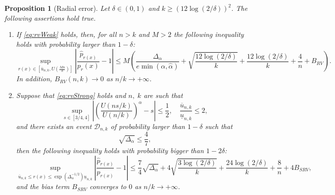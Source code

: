 \documentclass{article}
\numberwithin{equation}{section}
\newtheorem{proposition}{Proposition}[section]
\begin{document}
\begin{proposition}[Radial error]\label{thm:radial-error-part} Let
\(\delta\in(0,1)\) and
\(k\geq (12\log(2/\delta))^2\). The following assertions hold true.
\begin{enumerate}[label=(\roman*)]
    \item If \eqref{eq:rvWeak} holds, then, for all \(n>k\) and \(M>2\)
        the following inequality holds with probability larger
        than \(1-\delta\):
        \begin{equation*}
            \sup_{r(x)\in \left[\overline{u}_{n,k},
            U(\frac{Mn}{k})\right]}
            \left|\frac{\widehat{p}_{r(x)}}{p_r(x)}-1\right|  \leq M
            \left(\frac{\Delta_{\alpha}}{e \min{(\alpha,
                \hat{\alpha})}} +
                \sqrt{\frac{12\log(2/\delta)}{k}} +
                \frac{12\log(2/\delta)}{k} + \frac{4}{n} +
            B_{RV}\right).
        \end{equation*}
        In addition, \(B_{RV}(n,k)\to 0\) as \(n/k\to +\infty\).
    \item Suppose that \eqref{eq:rvStrong} holds and \(n, \; k\)
        are such that
        \begin{equation}\label{eq:main_result:uniform_boundness_slowly_varying}
            \sup_{s\in[3/4,4]}{\left|\left(\frac{U(ns/k)}{U(n/k)}\right)^{\alpha}-s\right|}\leq
            \frac{1}{2},\quad
            \frac{\overline{u}_{n,k}}{\underline{u}_{n,k}}\leq 2,
        \end{equation}
        and there exists an event \(\mathcal{D}_{n,k}\) of
        probability larger than \(1-\delta\)
        such that
        \begin{equation}\label{eq:hypotheses_on_Delta}
            \sqrt{\Delta_{\alpha}}\leq \frac{4}{7},
        \end{equation}
        then the following inequality holds with probability bigger
        than \(1-2\delta\):
        \begin{equation*}
            \sup_{\overline{u}_{n,k}\leq r(x)\leq
            \exp{\left(\Delta_\alpha^{-1/2}\right)}\underline{u}_{n,k}}
            \left|\frac{\widehat{p}_{r(x)}}{p_{r(x)}}-1\right|\leq
            \frac{7}{4}\sqrt{\Delta_{\alpha}} +
            4\sqrt{\frac{3\log(2/\delta)}{k}} +
            \frac{24\log(2/\delta)}{k} + \frac{8}{n} + 4B_{SRV},
        \end{equation*}
        and the bias term \(B_{SRV}\) converges to \(0\) as
        \(n/k\to +\infty\).
\end{enumerate}
\end{proposition}
\end{document}
